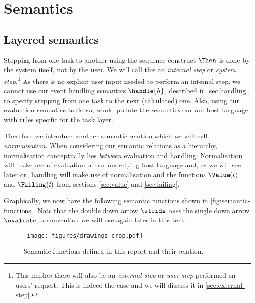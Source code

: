 

\section{Semantics}



\subsection{Layered semantics}
\label{sec:normalise}
\label{sec:drive}

Stepping from one task to another using the sequence construct $\Then$ is done by the system itself,
not by the user.
We will call this an \emph{internal step} or \emph{system step}.\footnote{
  This implies there will also be an \emph{external step} or \emph{user step} performed on users' request.
  This is indeed the case and we will discuss it in \autoref{sec:external-step}.
}
As there is no explicit user input needed to perform an internal step,
we cannot use our event handling semantics $\handle{h}$,
described in \autoref{sec:handling},
to specify stepping from one task to the next (calculated) one.
Also,
using our evaluation semantics to do so,
would pollute the semantics our our host language with rules specific for the task layer.

Therefore we introduce another semantic relation which we will call \emph{normalisation}.
When considering our semantic relations as a hierarchy,
normalisation conceptually lies \emph{between} evaluation and handling.
Normalisation will make use of evaluation of our underlying host language and,
as we will see later on,
handling will make use of normalisation
and the functions $\Value(t)$ and $\Failing(t)$ from sections \autoref{sec:value} and \autoref{sec:failing}.

Graphically,
we now have the following semantic functions shown in \autoref{fig:semantic-functions}.
Note that the double down arrow $\stride$ \emph{uses} the single down arrow $\evaluate$,
a convention we will use again later in this text.

\begin{figure}[h]
  \centering
  \texttt{[image: figures/drawings-crop.pdf]}
  \caption{
    Semantic functions defined in this report and their relation.
  }
  \label{fig:semantic-functions}
\end{figure}

